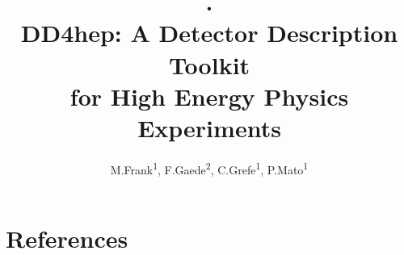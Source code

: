 \documentclass[a4paper]{jpconf}
\begin{document}
\title{
\vspace{-3cm}.\\
DD4hep: A Detector Description Toolkit \\
for High Energy Physics Experiments}

\author{
M.Frank\textsuperscript{1},
F.Gaede\textsuperscript{2},
C.Grefe\textsuperscript{1},
P.Mato\textsuperscript{1}
}

\address{\textsuperscript{1} CERN, 1211 Geneva 23, Switzerland}
\address{\textsuperscript{2} Desy, 22607 Hamburg, Germany}


\begin{abstract}

\end{abstract}



\vspace{-0.1cm}
\section*{References}
\begin{thebibliography}{9}

\end{thebibliography}
\end{document}
